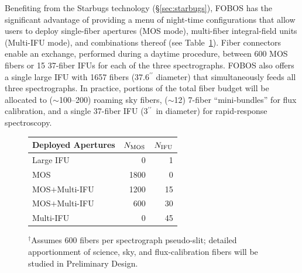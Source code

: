 \documentclass[oneside,11pt]{amsart}
\newcommand{\arcsec}{\mbox{$^{\prime\prime}$}}
\begin{document}
Benefiting from the Starbugs technology (\S \ref{sec:starbugs}), FOBOS has the significant advantage of providing a menu of night-time configurations that allow users to deploy single-fiber apertures (MOS mode), multi-fiber integral-field units (Multi-IFU mode), and combinations thereof (see Table~\ref{tab:sampling}).  Fiber connectors enable an exchange, performed during a daytime procedure, between 600 MOS fibers or 15 37-fiber IFUs for each of the three spectrographs.  FOBOS also offers a single large IFU with 1657 fibers (37.6\arcsec{} diameter)
that simultaneously feeds all three spectrographs. In practice, portions of the total fiber budget will be allocated to ($\sim$100--200) roaming sky fibers, ($\sim$12) 7-fiber ``mini-bundles'' for flux calibration, and a single 37-fiber IFU (3\arcsec\ in diameter) for rapid-response spectroscopy. 


\begin{figure}
\begin{threeparttable}
\label{tab:sampling}
\begin{tabular}{l | r r }
\hline
Deployed Apertures  & $N_{\rm MOS}$ &  $N_{\rm IFU}$ \\
\hline
Large IFU           &     0 &      1  \\
MOS                 &  1800 &      0  \\
MOS$+$Multi-IFU     &  1200 &     15  \\
MOS$+$Multi-IFU     &   600 &     30  \\
Multi-IFU           &     0 &     45  \\
\hline
\end{tabular}
\begin{footnotesize}
\begin{tablenotes}
\item $^\dagger$Assumes 600 fibers per spectrograph pseudo-slit; detailed apportionment of science, sky, and flux-calibration fibers will be studied in Preliminary Design.
\end{tablenotes}
\end{footnotesize}
\end{threeparttable}
\end{figure}
\end{document}
